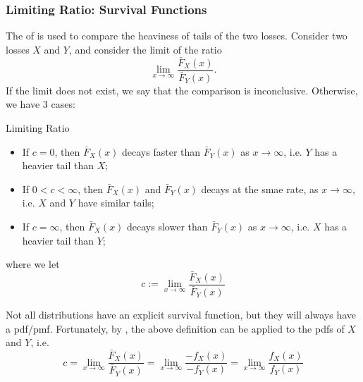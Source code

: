 \documentclass[notoc,notitlepage]{tufte-book}
\begin{document}
\subsubsection{Limiting Ratio: Survival Functions}%
\label{ssub:limiting_ratio_survival_functions}

\begin{defn}\label{defn:limiting_ratio}
  The  of  is used to compare the heaviness of tails of the two losses. Consider two losses $X$ and $Y$, and consider the limit of the ratio
  \begin{equation*}
    \lim_{x \to \infty} \frac{\bar{F}_X(x)}{\bar{F}_Y(x)}.
  \end{equation*}
  If the limit does not exist, we say that the comparison is inconclusive. Otherwise, we have 3 cases:
  \begin{marginfigure}
    \centering
    \caption{Limiting Ratio}\label{fig:limiting_ratio}
  \end{marginfigure}
  \begin{itemize}
    \item If $c = 0$, then $\bar{F}_X(x)$ decays faster than $\bar{F}_Y(x)$ as $x \to \infty$, i.e. $Y$ has a heavier tail than $X$;
    \item If $0 < c < \infty$, then $\bar{F}_X(x)$ and $\bar{F}_Y(x)$ decays at the smae rate, as $x \to \infty$, i.e. $X$ and $Y$ have similar tails;
    \item If $c = \infty$, then $\bar{F}_X(x)$ decays slower than $\bar{F}_Y(x)$ as $x \to \infty$, i.e. $X$ has a heavier tail than $Y$;
  \end{itemize}
  where we let
  \begin{equation*}
    c := \lim_{x \to \infty} \frac{\bar{F}_X(x)}{\bar{F}_Y(x)}
  \end{equation*}
\end{defn}

\begin{note}
  Not all distributions have an explicit survival function, but they will always have a pdf/pmf. Fortunately, by , the above definition can be applied to the pdfs of $X$ and $Y$, i.e.
  \begin{equation*}
    c = \lim_{x \to \infty} \frac{\bar{F}_X(x)}{\bar{F}_Y(x)} = \lim_{x \to \infty} \frac{-f_X(x)}{-f_Y(x)} = \lim_{x \to \infty} \frac{f_X(x)}{f_Y(x)}
  \end{equation*}
\end{note}
\end{document}
